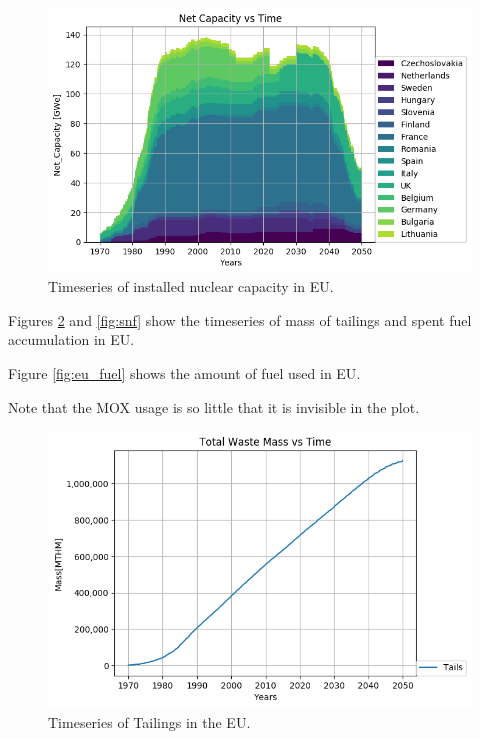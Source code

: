 \begin{figure}[htbp!]
	\begin{center}
		\includegraphics[width=\columnwidth]{./images/eu_future/power_plot.png}
	\end{center}
	\caption{Timeseries of installed nuclear capacity in \gls{EU}.}
	\label{fig:eu_pow}
\end{figure}

Figures \ref{fig:eu_tail} and \ref{fig:snf} show the 
timeseries of mass of tailings and spent fuel accumulation in \gls{EU}.

Figure \ref{fig:eu_fuel} shows the amount of fuel used in \gls{EU}.

Note that the MOX usage is so little that it is invisible in the
plot. 


\begin{figure}[htbp!]
	\begin{center}
		\includegraphics[width=\columnwidth]{./images/eu_future/tailings.png}
	\end{center}
	\caption{Timeseries of Tailings in the \gls{EU}.}
	\label{fig:eu_tail}
\end{figure}

